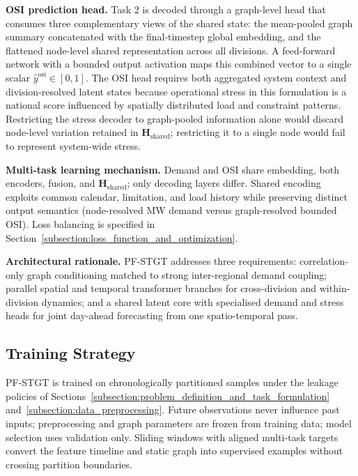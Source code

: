 \textbf{OSI prediction head.} Task 2 is decoded through a graph-level head that consumes three complementary views of the shared state: the mean-pooled graph summary concatenated with the final-timestep global embedding, and the flattened node-level shared representation across all divisions. A feed-forward network with a bounded output activation maps this combined vector to a single scalar \(\hat{y}^{\mathrm{osi}} \in [0, 1]\). The OSI head requires both aggregated system context and division-resolved latent states because operational stress in this formulation is a national score influenced by spatially distributed load and constraint patterns. Restricting the stress decoder to graph-pooled information alone would discard node-level variation retained in \(\mathbf{H}_{\mathrm{shared}}\); restricting it to a single node would fail to represent system-wide stress.

\textbf{Multi-task learning mechanism.} Demand and OSI share embedding, both encoders, fusion, and \(\mathbf{H}_{\mathrm{shared}}\); only decoding layers differ. Shared encoding exploits common calendar, limitation, and load history while preserving distinct output semantics (node-resolved MW demand versus graph-resolved bounded OSI). Loss balancing is specified in Section~\ref{subsection:loss_function_and_optimization}.

\textbf{Architectural rationale.} PF-STGT addresses three requirements: correlation-only graph conditioning matched to strong inter-regional demand coupling; parallel spatial and temporal transformer branches for cross-division and within-division dynamics; and a shared latent core with specialised demand and stress heads for joint day-ahead forecasting from one spatio-temporal pass.

\subsection{Training Strategy}\label{subsection:training_strategy}

PF-STGT is trained on chronologically partitioned samples under the leakage policies of Sections~\ref{subsection:problem_definition_and_task_formulation} and~\ref{subsection:data_preprocessing}. Future observations never influence past inputs; preprocessing and graph parameters are frozen from training data; model selection uses validation only. Sliding windows with aligned multi-task targets convert the feature timeline and static graph into supervised examples without crossing partition boundaries.

